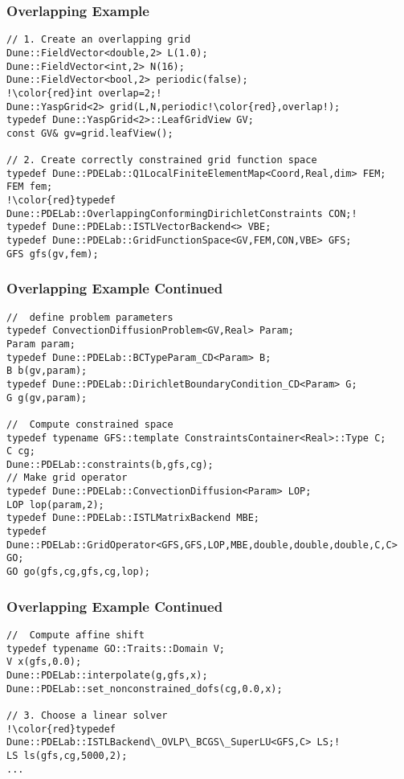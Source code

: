 \begin{frame}[fragile]
  \frametitle{Overlapping Example}
  \begin{lstlisting}[breaklines=true,escapechar=!]
// 1. Create an overlapping grid
Dune::FieldVector<double,2> L(1.0);
Dune::FieldVector<int,2> N(16);
Dune::FieldVector<bool,2> periodic(false);
!\color{red}int overlap=2;!
Dune::YaspGrid<2> grid(L,N,periodic!\color{red},overlap!);
typedef Dune::YaspGrid<2>::LeafGridView GV;
const GV& gv=grid.leafView();

// 2. Create correctly constrained grid function space
typedef Dune::PDELab::Q1LocalFiniteElementMap<Coord,Real,dim> FEM;
FEM fem;
!\color{red}typedef Dune::PDELab::OverlappingConformingDirichletConstraints CON;!
typedef Dune::PDELab::ISTLVectorBackend<> VBE;
typedef Dune::PDELab::GridFunctionSpace<GV,FEM,CON,VBE> GFS;
GFS gfs(gv,fem);
\end{lstlisting}
\end{frame}
\begin{frame}[fragile]
\frametitle<presentation>{Overlapping Example Continued}
  \begin{lstlisting}[breaklines=true]
//  define problem parameters
typedef ConvectionDiffusionProblem<GV,Real> Param;
Param param;
typedef Dune::PDELab::BCTypeParam_CD<Param> B;
B b(gv,param);
typedef Dune::PDELab::DirichletBoundaryCondition_CD<Param> G;
G g(gv,param);

//  Compute constrained space
typedef typename GFS::template ConstraintsContainer<Real>::Type C;
C cg;
Dune::PDELab::constraints(b,gfs,cg);
// Make grid operator
typedef Dune::PDELab::ConvectionDiffusion<Param> LOP;
LOP lop(param,2);
typedef Dune::PDELab::ISTLMatrixBackend MBE;
typedef Dune::PDELab::GridOperator<GFS,GFS,LOP,MBE,double,double,double,C,C> GO;
GO go(gfs,cg,gfs,cg,lop);
\end{lstlisting}
\end{frame}
\begin{frame}[fragile]
\frametitle<presentation>{Overlapping Example Continued}
  \begin{lstlisting}[breaklines=true,escapechar=!]
//  Compute affine shift
typedef typename GO::Traits::Domain V;
V x(gfs,0.0);
Dune::PDELab::interpolate(g,gfs,x);
Dune::PDELab::set_nonconstrained_dofs(cg,0.0,x);

// 3. Choose a linear solver
!\color{red}typedef Dune::PDELab::ISTLBackend\_OVLP\_BCGS\_SuperLU<GFS,C> LS;!
LS ls(gfs,cg,5000,2);
...
\end{lstlisting}
\end{frame}

